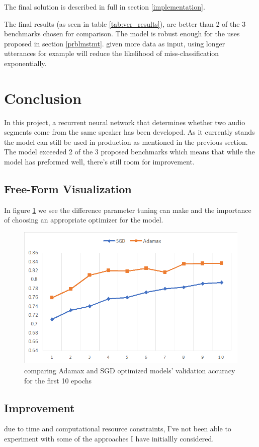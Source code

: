 \documentclass{article}
\begin{document}
The final solution is described in full in section \ref{implementation}.

The final results (as seen in table \ref{tab:ver_results}), are better than 2 of the 3 benchmarks chosen for comparison. The model is robust enough for the uses proposed in section \ref{prblmstmt}.
given more data as input, using longer utterances for example will reduce the likelihood of miss-classification exponentially.
\section{Conclusion}
In this project, a recurrent neural network that determines whether two audio segments come from the same speaker has been developed.  As it currently stands the model can still be used in production as mentioned in the previous section. The model exceeded 2 of the 3 proposed benchmarks which means that while the model has preformed well, there's still room for improvement.
\subsection{Free-Form Visualization}
In figure \ref{fig:optimizers} we see the difference parameter tuning can make and the importance of choosing an appropriate optimizer for the model.
\begin{figure}[H]
    \centering
    \includegraphics[scale=.5]{images/admax_v_sgd.png}
    \caption{comparing Adamax and SGD optimized models' validation accuracy for the first 10 epochs}
    \label{fig:optimizers}
\end{figure}
\subsection{Improvement}
due to time and computational resource constraints, I've not been able to experiment with some of the approaches I have initiallly considered.
\end{document}
